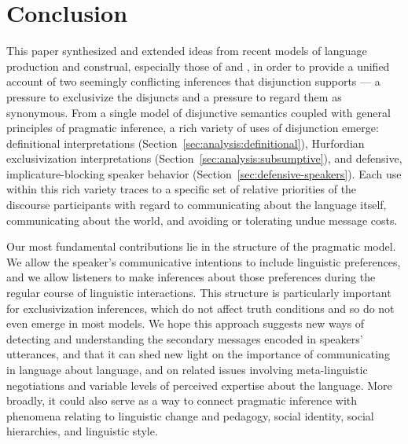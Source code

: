 \documentclass[12pt,twoside]{article}
\renewcommand{\_}{\textbf{\textunderscore\hspace{-4pt}\textunderscore\hspace{-3pt}\textunderscore\hspace{-4pt}\textunderscore}\hspace{0.5pt}}			%
\begin{document}

\section{Conclusion}\label{sec:conclusion}

This paper synthesized and extended ideas from recent models of
language production and construal, especially those of
\citet{Smith:Goodman:Frank:2013} and \citet{bergen-levy-goodman:2014},
in order to provide a unified account of two seemingly conflicting
inferences that disjunction supports --- a pressure to exclusivize the
disjuncts and a pressure to regard them as synonymous.  From a single
model of disjunctive semantics coupled with general principles of
pragmatic inference, a rich variety of uses of disjunction emerge:
definitional interpretations
(Section~\ref{sec:analysis:definitional}), Hurfordian exclusivization
interpretations (Section~\ref{sec:analysis:subsumptive}), and
defensive, implicature-blocking speaker behavior
(Section~\ref{sec:defensive-speakers}).  Each use within this rich
variety traces to a specific set of relative priorities of the
discourse participants with regard to communicating about the language
itself, communicating about the world, and avoiding or tolerating
undue message costs.

Our most fundamental contributions lie in the structure of the
pragmatic model. We allow the speaker's communicative intentions to
include linguistic preferences, and we allow listeners to make
inferences about those preferences during the regular course of
linguistic interactions. This structure is particularly important for
exclusivization inferences, which do not affect truth conditions and
so do not even emerge in most models.  We hope this approach suggests
new ways of detecting and understanding the secondary messages encoded
in speakers' utterances, and that it can shed new light on the
importance of communicating in language about language, and on related
issues involving meta-linguistic negotiations and variable levels of
perceived expertise about the language. More broadly, it could also
serve as a way to connect pragmatic inference with phenomena relating
to linguistic change and pedagogy, social identity, social
hierarchies, and linguistic style.




\end{document}
